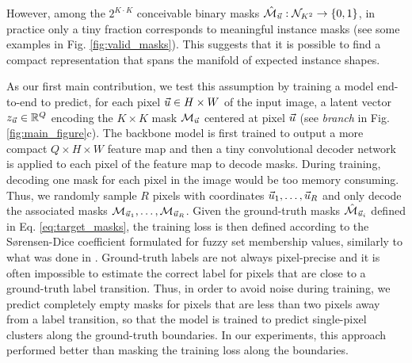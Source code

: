 However, among the $2^{K\cdot K}$ conceivable binary masks $\hat{\mathcal{M}}_{\vec{u}}: \mathcal{N}_{K^2} \rightarrow \{0,1\}$, in practice only a tiny fraction corresponds to meaningful instance masks (see some examples in Fig. \ref{fig:valid_masks}). 
This suggests that it is possible to find a compact representation that spans the manifold of expected instance shapes.

As our first main contribution, we test this assumption by training a model end-to-end to predict, for each pixel $\vec{u}\in H\times W$ of the input image, a latent vector $z_{\vec{u}}\in \mathbb{R}^Q$ encoding the $K \times K$ \maskname mask $\mathcal{M}_{\vec{u}}$ centered at pixel $\vec{u}$ (see \emph{\encBr branch} in Fig. \ref{fig:main_figure}c). 
The backbone model is first trained to output a more compact $Q\times H\times W$ feature map and
then a tiny convolutional decoder network is applied to each pixel of the feature map to decode masks.
During training, decoding one mask for each pixel in the image would be too memory consuming. Thus, we randomly sample $R$ pixels with coordinates $\vec{u}_1, \ldots, \vec{u}_R$ and only decode the associated masks $\mathcal{M}_{\vec{u}_1}, \ldots, \mathcal{M}_{\vec{u}_R}$. 
Given the ground-truth \maskname masks $\hat{\mathcal{M}}_{\vec{u}_i}$ defined in Eq. \ref{eq:target_masks}, the training loss is then defined according to the S\o rensen-Dice coefficient formulated for fuzzy set membership values, similarly to what was done in \cite{wolf2018mutex}.
Ground-truth labels are not always pixel-precise and it is often impossible to estimate the correct label for pixels that are close to a ground-truth label transition. Thus, in order to avoid noise during training, we predict completely empty masks for pixels that are less than two pixels away from a label transition, so that the model is trained to predict single-pixel clusters along the ground-truth boundaries. In our experiments, this approach performed better than masking the training loss along the boundaries.


